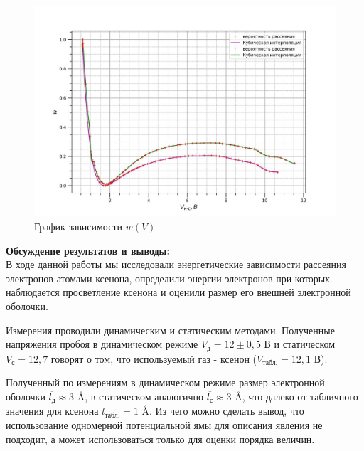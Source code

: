 \documentclass[a4paper, 12pt]{article}%
\begin{document}
\begin{enumerate}
	
	\begin{figure}[H]
		\centering
		\includegraphics[width=1\linewidth]{2}
		\caption{График зависимости $w(V)$}
	\end{figure}
	
	\textbf{Обсуждение результатов и выводы: }\\
	
	В ходе данной работы мы исследовали энергетические зависимости рассеяния электронов атомами ксенона, определили энергии электронов при которых наблюдается просветление ксенона и оценили размер его внешней электронной оболочки.
	
	Измерения проводили динамическим и статическим методами. Полученные напряжения пробоя в динамическом режиме $ V_{\text{д}} = 12 \pm 0,5$ В и статическом $ V_{\text{с}} = 12,7 $ говорят о том, что используемый газ - ксенон ($ V_{\text{табл.}} = 12,1 $ В).
	
	Полученный по измерениям в динамическом режиме размер электронной оболочки $\overline{ l_{\text{д}}} \approx  3$ \AA, в статическом аналогично $\overline{ l_{\text{с}}} \approx  3$ \AA, что далеко от табличного значения для ксенона $l_{\text{табл.}} = 1$ \AA. Из чего можно сделать вывод, что использование одномерной потенциальной ямы для описания явления не подходит, а может использоваться только для оценки порядка величин.
	
	
	
	
	
	
	
	
	
	
	\end{enumerate}
	
	
\end{document}
